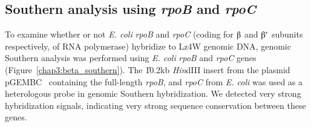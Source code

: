 \subsection{Southern analysis using \emph{rpoB} and \emph{rpoC}}

To examine whether or not \emph{E. coli} \emph{rpoB} and
\emph{rpoC} (coding for $\betaup$ and $\betaup'$ subunits
respectively, of RNA polymerase) hybridize to Lz4W genomic DNA,
genomic Southern analysis was performed using \emph{E. coli}
\emph{rpoB} and \emph{rpoC} genes
(Figure~\ref{chap3:beta_southern}). The \U{10.2}{kb}
\emph{Hin}dIII insert from the plasmid pGEMBC~\citep{Igarashi1991}
containing the full-length \emph{rpoB}, and \emph{rpoC} from
\emph{E. coli} was used as a heterologous probe in genomic
Southern hybridization. We detected very strong hybridization
signals, indicating very strong sequence conservation between
these genes.

